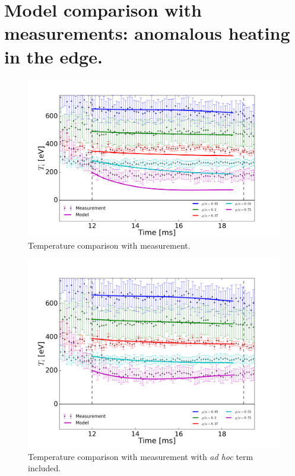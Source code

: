 
\section{Model comparison with measurements: anomalous heating in the edge.}\label{sec:results_results}
\begin{figure}
    \centering
    \includegraphics[width = \textwidth]{ion_transport_results/temperature_results.png}
    \caption[Temperature comparison with measurement]{Temperature comparison with measurement.}
    \label{fig:temperature_results}
\end{figure}

\begin{figure}
    \centering
    \includegraphics[width = \textwidth]{ion_transport_results/temperature_with_adhoc.png}
    \caption[Temperature comparison with measurement with \textit{ad hoc} term included]{Temperature comparison with measurement with \textit{ad hoc} term included.}
    \label{fig:temperature_results_ah}
\end{figure}

